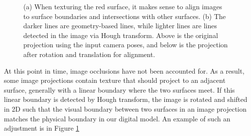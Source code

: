 \documentclass[]{spie}  %
\begin{document}
{\begin{figure}
  \centering
  \caption{(a) When texturing the red surface, it makes sense to align
    images to surface boundaries and intersections with other
    surfaces. (b) The darker lines are geometry-based lines, while
    lighter lines are lines detected in the image via Hough
    transform. Above is the original projection using the input camera
    poses, and below is the projection after rotation and translation
    for alignment.}
  \label{fig:geometryAlignment}
\end{figure}


At this point in time, image occlusions have not been accounted
for. As a result, some image projections contain texture that should
project to an adjacent surface, generally with a linear boundary where
the two surfaces meet. If this linear boundary is detected by Hough
transform, the image is rotated and shifted in 2D such that the visual
boundary between two surfaces in an image projection matches the
physical boundary in our digital model. An example of such an
adjustment is in Figure \ref{fig:geometryAlignment}

}
\end{document}

